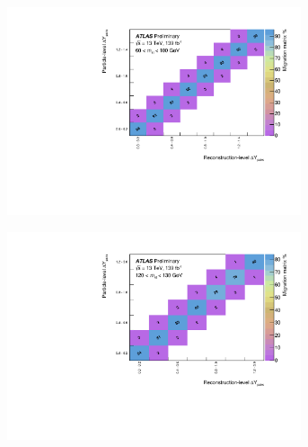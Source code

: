 
\begin{figure}[htb]
    \centering
    \begin{subfigure}{.49\textwidth}\centering\includegraphics[width = 0.95\textwidth]{Figures/m4l/UnfoldingStudies/v014_matrices/deltaYPairs_m4l60-100Matrix.pdf}\end{subfigure}
    \begin{subfigure}{.49\textwidth}\centering\includegraphics[width = 0.95\textwidth]{Figures/m4l/UnfoldingStudies/v014_matrices/deltaYPairs_m4l120-130Matrix.pdf}\end{subfigure}

\end{figure}
